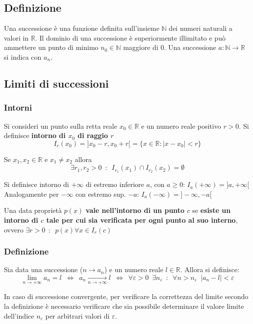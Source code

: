 \documentclass[10pt]{article}
\theoremstyle{plain}
\begin{document}
\subsection{Definizione}
\begin{defin}
Una successione è una funzione definita sull'insieme $\mathbb{N}$ dei numeri naturali a valori in $\mathbb{R}$. Il dominio di una successione è superiormente illimitato e può ammettere un punto di minimo $n_0 \in \mathbb{N}$ maggiore di 0. Una successione $a : \mathbb{N} \rightarrow \mathbb{R}$ si indica con $a_n$.
\end{defin}

\subsection{Limiti di successioni}
\subsubsection{Intorni}
\begin{defin}
    Si consideri un punto sulla retta reale $x_0 \in \mathbb{R}$ e un numero reale positivo $r > 0$. Si definisce \textbf{intorno di $x_0$ di raggio $r$} 
    \[I_r(x_0) = ]x_0 - r, x_0 +r[ = \{x \in \mathbb{R} : |x - x_0| < r\}\]
\end{defin}
\begin{oss}
    Se $x_1, x_2 \in \mathbb{R}$ e $x_1 \neq x_2$ allora 
    \[\exists r_1, r_2 > 0 \enspace : \enspace I_{r_1}(x_1) \cap I_{r_2}(x_2) = \emptyset\]
\end{oss}

\begin{defin}
    Si definisce intorno di $+\infty$ di estremo inferiore $a$, con $a \geq 0$: $I_a(+\infty) = ]a, +\infty[$
    \\Analogamente per $-\infty$ con estremo sup. $-a$:
    $I_{a}(-\infty) = ]-\infty, -a[$
\end{defin}

Una data proprietà $p(x)$ \textbf{vale nell'intorno di un punto $c$} se \textbf{esiste un intorno di $c$ tale per cui sia verificata per ogni punto al suo interno}, ovvero $\exists r>0 \enspace : \enspace p(x) \forall x \in I_r(c)$

\subsubsection{Definizione}
\begin{defin}
    Sia data una successione ($n \rightarrow a_n$) e un numero reale $l \in \mathbb{R}$. Allora si definisce:
    \[\lim \limits_{n \rightarrow + \infty} a_n = l \enspace \Leftrightarrow \enspace a_n \xrightarrow[n \rightarrow + \infty]{} l \enspace \Leftrightarrow \enspace \forall \varepsilon > 0 \enspace \exists n_\varepsilon \enspace : \enspace \forall n > n_\varepsilon \enspace |a_n - l| < \varepsilon\]
\end{defin}
In caso di successione convergente, per verificare la correttezza del limite secondo la definizione è necessario verificare che sia possibile determinare il valore limite dell'indice $n_\varepsilon$ per arbitrari valori di $\varepsilon$.
\end{document}
